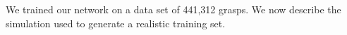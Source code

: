 We trained our network on a data set of 441,312 grasps. We now describe the simulation used to generate a realistic training set. %


